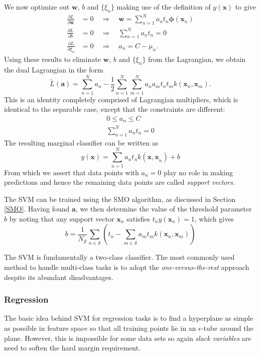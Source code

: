 \documentclass[a4paper]{book}
\renewcommand{\bf}{\mathbf}
\renewcommand{\cal}{\mathcal}
\newcommand{\imp}[1]{\textit{#1}}
\newcommand{\bs}{\boldsymbol}
\begin{document}
We now optimize out $\bf{w}$, $b$ and $\{\xi_n\}$ making use of the definition of $y(\bf{x})$ to give
\begin{align}
	\frac{\partial L}{\partial \bf{w}} &= 0 \quad \Rightarrow \quad \bf{w} = \sum_{n=1}^N a_n t_n \bs{\phi}(\bf{x}_n) \\
	\frac{\partial L}{\partial b} &= 0 \quad \Rightarrow \quad \sum_{n=1}^N a_n t_n = 0\\
	\frac{\partial L}{\partial \xi_n} &= 0  \quad \Rightarrow \quad a_n = C -\mu_n.
\end{align}
Using these results to eliminate $\bf{w}$, $b$ and $\{\xi_n\}$ from the Lagrangian, we obtain the dual Lagrangian in the form
\begin{equation}
	\tilde{L}(\bf{a}) = \sum_{n=1}^N a_n -\frac{1}{2} \sum_{n=1}^N \sum_{m=1}^N a_n a_m t_n t_m k(\bf{x}_n,\bf{x}_m).
\end{equation}
This is an identity completely comprised of Lagrangian multipliers, which is identical to the separable case, except that the constraints are different:
\begin{align}
	0 \leq a_n \leq C \\
	\sum_{n=1}^N a_n t_n = 0
\end{align}
The resulting marginal classifier can be written as
\begin{equation}
	y(\bf{x}) = \sum_{n=1}^N a_n t_n k(\bf{x,x}_n) + b
\end{equation}
From which we assert that data points with $a_n = 0$ play no role in making predictions and hence the remaining data points are called \imp{support vectors}.

The SVM can be trained using the SMO algorithm, as discussed in Section \ref{SMO}. Having found $\bf{a}$, we then determine the value of the threshold parameter $b$ by noting that any support vector $\bf{x}_n$ satisfies $t_ny(\bf{x}_n) = 1$, which gives
\begin{equation}
	b = \frac{1}{N_{\cal{S}}} \sum_{n \in \cal{S}} \left( t_n - \sum_{m \in \cal{S}} a_m t_m k(\bf{x}_n,\bf{x}_m) \right)
\end{equation}

The SVM is fundamentally a two-class classifier. The most commonly used method to handle multi-class tasks is to adopt the \imp{one-versus-the-rest} approach despite its abundant disadvantages.

\subsubsection{Regression}
The basic idea behind SVM for regression tasks is to find a hyperplane as simple as possible in feature space so that all training points lie in an $\epsilon$-tube around the plane. However, this is impossible for some data sets so again \imp{slack variables} are need to soften the hard margin requirement.
\end{document}
